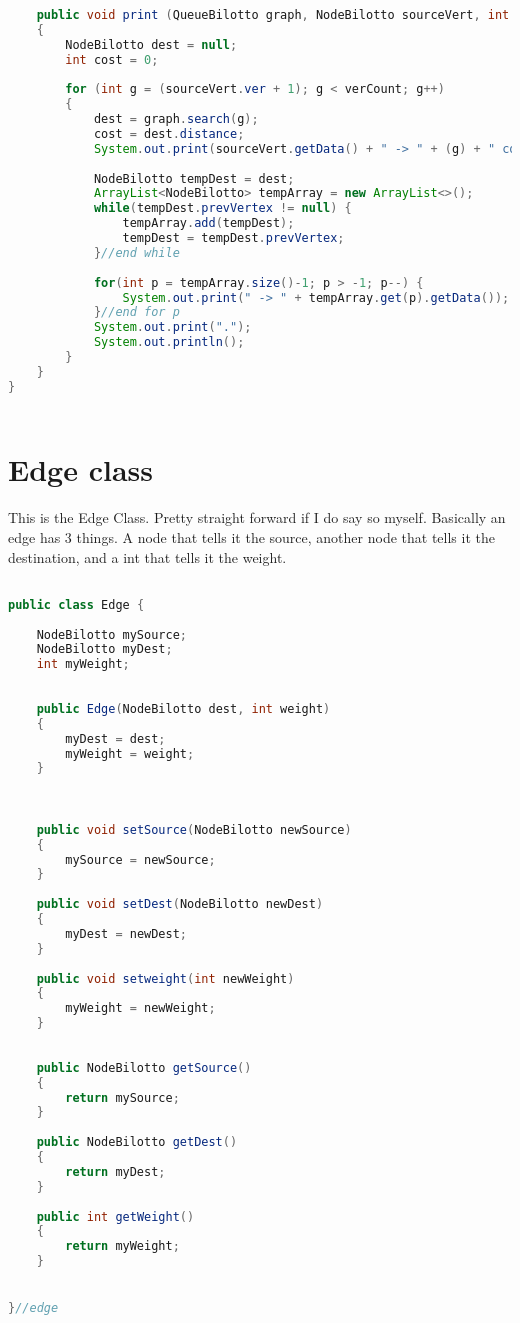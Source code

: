 \documentclass[letterpaper, 10pt]{article}
\begin{document}
\begin{lstlisting}[language = java]
	
	public void print (QueueBilotto graph, NodeBilotto sourceVert, int verCount)
	{
		NodeBilotto dest = null;
		int cost = 0;
		
		for (int g = (sourceVert.ver + 1); g < verCount; g++)
		{
			dest = graph.search(g);
			cost = dest.distance;
			System.out.print(sourceVert.getData() + " -> " + (g) + " cost is " + cost + "; path is " + sourceVert.getData());
			
			NodeBilotto tempDest = dest;
			ArrayList<NodeBilotto> tempArray = new ArrayList<>();
			while(tempDest.prevVertex != null) {
				tempArray.add(tempDest);
				tempDest = tempDest.prevVertex;
			}//end while
			
			for(int p = tempArray.size()-1; p > -1; p--) {
				System.out.print(" -> " + tempArray.get(p).getData());
			}//end for p
			System.out.print(".");
			System.out.println();
		}
	}
}



\end{lstlisting}

\section{Edge class}
This is the Edge Class. Pretty straight forward if I do say so myself. Basically an edge has 3 things. A node that tells it the source, another node that tells it the destination, and a int that tells it the weight.
\begin{lstlisting}[language = java]

public class Edge {
	
	NodeBilotto mySource;
	NodeBilotto myDest;
	int myWeight;
	
	
	public Edge(NodeBilotto dest, int weight)
	{
		myDest = dest;
		myWeight = weight;
	}
	
	 

	public void setSource(NodeBilotto newSource)
	{
		mySource = newSource;
	}
	
	public void setDest(NodeBilotto newDest)
	{
		myDest = newDest;
	}
	
	public void setweight(int newWeight)
	{
		myWeight = newWeight;
	}
	
	
	public NodeBilotto getSource()
	{
		return mySource;
	}
	
	public NodeBilotto getDest()
	{
		return myDest;
	}
	
	public int getWeight()
	{
		return myWeight;
	}
	

}//edge

\end{lstlisting}
\end{document}
